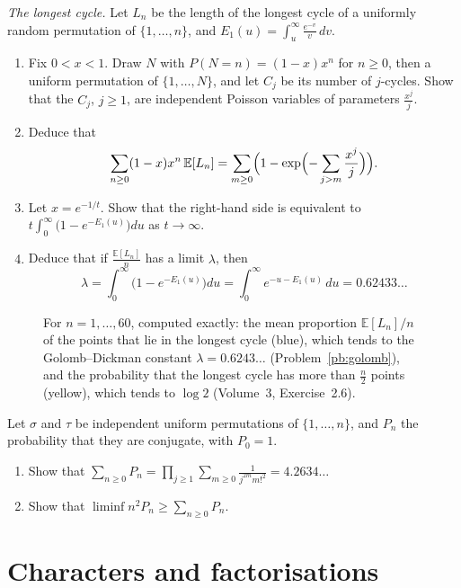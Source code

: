 \begin{exercise}[Journey]\label{pb:golomb}
\emph{The longest cycle.} Let $L_n$ be the length of the longest cycle of a uniformly random permutation of
$\{1,\dots,n\}$, and $E_1(u)=\int_u^\infty\frac{e^{-v}}v\,dv$.
\begin{enumerate}[label=(\alph*)]
\item Fix $0<x<1$. Draw $N$ with $P(N=n)=(1-x)x^n$ for $n\ge0$, then a uniform permutation of $\{1,\dots,N\}$, and let
$C_j$ be its number of $j$-cycles. Show that the $C_j$, $j\ge1$, are independent Poisson variables of parameters $\frac{x^j}j$.
\item Deduce that
\[
\sum_{n\ge0}(1-x)x^n\,\mathbb E[L_n]=\sum_{m\ge0}\Bigl(1-\exp\Bigl(-\sum_{j>m}\frac{x^j}j\Bigr)\Bigr).
\]
\item Let $x=e^{-1/t}$. Show that the right-hand side is equivalent to $t\int_0^\infty\bigl(1-e^{-E_1(u)}\bigr)du$ as
$t\to\infty$.
\item Deduce that if $\frac{\mathbb E[L_n]}n$ has a limit $\lambda$, then
\[
\lambda=\int_0^\infty\bigl(1-e^{-E_1(u)}\bigr)du=\int_0^\infty e^{-u-E_1(u)}\,du=0.62433\ldots
\]
\end{enumerate}
\end{exercise}

\begin{figure}[ht]
\centering
{}
\caption{For $n=1,\dots,60$, computed exactly: the mean proportion $\mathbb E[L_n]/n$ of the points that lie in the longest
cycle (blue), which tends to the Golomb--Dickman constant $\lambda=0.6243\ldots$ (Problem~\ref{pb:golomb}), and the
probability that the longest cycle has more than $\frac n2$ points (yellow), which tends to $\log2$ (Volume~3, Exercise~2.6).}
\label{fig:longest}
\end{figure}

\begin{exercise}[$\star\star$]\label{pb:conjugate}
Let $\sigma$ and $\tau$ be independent uniform permutations of $\{1,\dots,n\}$, and $P_n$ the probability that they are
conjugate, with $P_0=1$.
\begin{enumerate}[label=(\alph*)]
\item Show that $\sum_{n\ge0}P_n=\prod_{j\ge1}\sum_{m\ge0}\frac1{j^{2m}m!^2}=4.2634\ldots$
\item Show that $\liminf n^2P_n\ge\sum_{n\ge0}P_n$.
\end{enumerate}
\end{exercise}

\section{Characters and factorisations}


